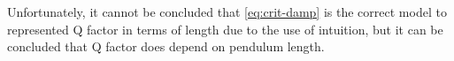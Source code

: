 \documentclass[11pt]{article}
\begin{document}
\begin{multicols}{2}
{Unfortunately, it cannot be concluded that \ref{eq:crit-damp} is the correct model to represented Q factor in terms of length due to the use of intuition, but it can be concluded that Q factor does depend on pendulum length.
}

\newpage

\end{multicols}

\printbibliography[heading=bibintoc]

\newpage

\appendix

% 
\end{document}

